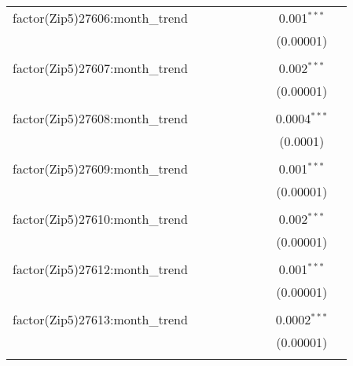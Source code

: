 \begin{table}[H]
{\begin{tabular}{@{\extracolsep{5pt}}lcccccccc}
  factor(Zip5)27606:month\_trend &  &  &  &  &  &  & 0.001$^{***}$ &  \\  

   &  &  &  &  &  &  & (0.00001) &  \\  

   & & & & & & & & \\  

  factor(Zip5)27607:month\_trend &  &  &  &  &  &  & 0.002$^{***}$ &  \\  

   &  &  &  &  &  &  & (0.00001) &  \\  

   & & & & & & & & \\  

  factor(Zip5)27608:month\_trend &  &  &  &  &  &  & 0.0004$^{***}$ &  \\  

   &  &  &  &  &  &  & (0.0001) &  \\  

   & & & & & & & & \\  

  factor(Zip5)27609:month\_trend &  &  &  &  &  &  & 0.001$^{***}$ &  \\  

   &  &  &  &  &  &  & (0.00001) &  \\  

   & & & & & & & & \\  

  factor(Zip5)27610:month\_trend &  &  &  &  &  &  & 0.002$^{***}$ &  \\  

   &  &  &  &  &  &  & (0.00001) &  \\  

   & & & & & & & & \\  

  factor(Zip5)27612:month\_trend &  &  &  &  &  &  & 0.001$^{***}$ &  \\  

   &  &  &  &  &  &  & (0.00001) &  \\  

   & & & & & & & & \\  

  factor(Zip5)27613:month\_trend &  &  &  &  &  &  & 0.0002$^{***}$ &  \\  

   &  &  &  &  &  &  & (0.00001) &  \\  

   & & & & & & & & \\  


\end{tabular}}
\end{table}
